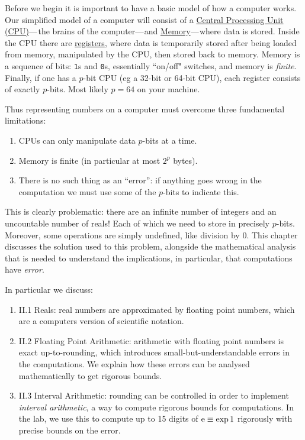 \documentclass[12pt,a4paper]{book}
\def\emdash{\hbox{---}}
\theoremstyle{definition}
\begin{document}
Before we begin it is important to have a basic model of how a computer works. Our simplified model of a computer will consist of a \href{https://en.wikipedia.org/wiki/Central_processing_unit}{Central Processing Unit (CPU)}\ensuremath{\emdash}the  brains of the computer\ensuremath{\emdash}and \href{https://en.wikipedia.org/wiki/Computer_data_storage#Primary_storage}{Memory}\ensuremath{\emdash}where  data is stored. Inside the CPU there are \href{https://en.wikipedia.org/wiki/Processor_register}{registers}, where data is temporarily stored after being loaded from memory, manipulated by the CPU, then stored back to memory.  Memory is a sequence of bits: \texttt{1}s and \texttt{0}s, essentially ``on/off" switches, and memory is {\it finite}.  Finally, if one has a $p$-bit CPU (eg a 32-bit or 64-bit CPU), each register consists of exactly $p$-bits. Most likely $p = 64$ on your machine.


Thus representing numbers on a computer must overcome three fundamental limitations:
\begin{enumerate}
\item CPUs can only manipulate data $p$-bits at a time.
\item Memory is finite (in particular at most $2^p$ bytes).
\item There is no such thing as an ``error'': if anything goes wrong in the computation we must use some of the $p$-bits to indicate this.
\end{enumerate}

This is clearly problematic: there are an infinite number of integers and an uncountable number of reals! Each of which we need to store in precisely $p$-bits. Moreover, some operations are simply undefined, like division by 0.  This chapter discusses the solution used to this problem, alongside the mathematical analysis that is needed to understand the implications, in particular, that computations have {\it error}.

In particular we discuss:

\begin{enumerate}
\item II.1 Reals:  real numbers are approximated by floating point numbers, which are a computers version of scientific notation.
\item II.2 Floating Point Arithmetic:  arithmetic with floating point numbers is exact up-to-rounding, which introduces small-but-understandable errors in the computations. We explain how these errors can be analysed mathematically to get rigorous bounds.
\item II.3 Interval Arithmetic: rounding can be controlled in order to implement {\it interval arithmetic}, a way to compute rigorous bounds for computations. In the lab, we use this to compute up to 15 digits of ${\rm e} \equiv \exp 1$ rigorously with precise bounds on the error.
\end{enumerate}
\end{document}
